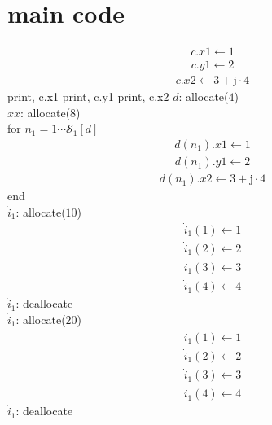 \documentclass[a4paper,fleqn]{ltjsarticle}
\begin{document}
\section{main code}
\begin{align}
c.x1 \leftarrow 1
\end{align}
\begin{align}
c.y1 \leftarrow 2
\end{align}
\begin{align}
c.x2 \leftarrow 3+\mathrm{j} \cdot 4
\end{align}
print, c.x1
print, c.y1
print, c.x2
$d$: allocate($4$)\\
$xx$: allocate($8$)\\
for $n_{1}=1\cdots \mathcal{S}_1[d]$\\
  \begin{align}
  d(n_{1}).x1 \leftarrow 1
  \end{align}
  \begin{align}
  d(n_{1}).y1 \leftarrow 2
  \end{align}
  \begin{align}
  d(n_{1}).x2 \leftarrow 3+\mathrm{j} \cdot 4
  \end{align}
end\\
$\dot{i}_{1}$: allocate($10$)\\
\begin{align}
\dot{i}_{1}(1) \leftarrow 1
\end{align}
\begin{align}
\dot{i}_{1}(2) \leftarrow 2
\end{align}
\begin{align}
\dot{i}_{1}(3) \leftarrow 3
\end{align}
\begin{align}
\dot{i}_{1}(4) \leftarrow 4
\end{align}
$\dot{i}_{1}$: deallocate\\
$\dot{i}_{1}$: allocate($20$)\\
\begin{align}
\dot{i}_{1}(1) \leftarrow 1
\end{align}
\begin{align}
\dot{i}_{1}(2) \leftarrow 2
\end{align}
\begin{align}
\dot{i}_{1}(3) \leftarrow 3
\end{align}
\begin{align}
\dot{i}_{1}(4) \leftarrow 4
\end{align}
$\dot{i}_{1}$: deallocate\\
\end{document}
